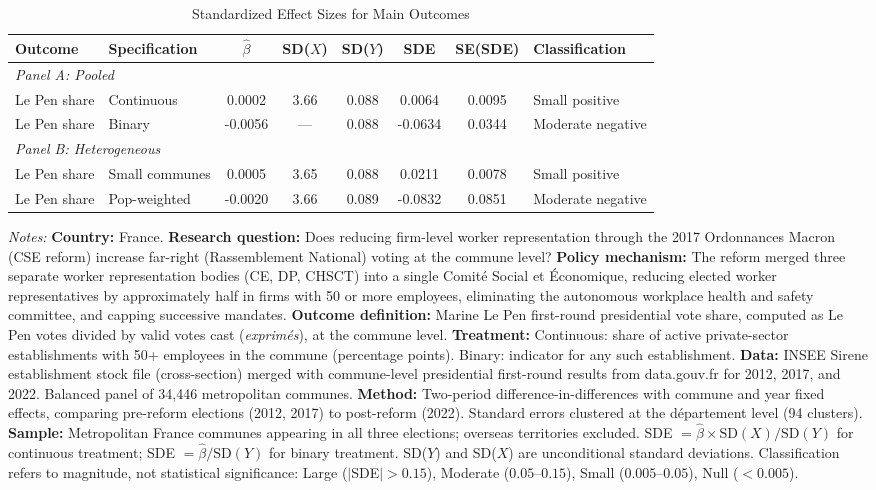 \begin{table}[H]
\centering
\caption{Standardized Effect Sizes for Main Outcomes}
\label{tab:sde}
\begin{adjustbox}{max width=\textwidth}
\begin{threeparttable}
\begin{tabular}{llcccccl}
\toprule
Outcome & Specification & $\hat{\beta}$ & SD($X$) & SD($Y$) & SDE & SE(SDE) & Classification \\
\midrule
\multicolumn{8}{l}{\textit{Panel A: Pooled}} \\
Le Pen share & Continuous & 0.0002 & 3.66 & 0.088 & 0.0064 & 0.0095 & Small positive \\
Le Pen share & Binary & -0.0056 & --- & 0.088 & -0.0634 & 0.0344 & Moderate negative \\
\midrule
\multicolumn{8}{l}{\textit{Panel B: Heterogeneous}} \\
Le Pen share & Small communes & 0.0005 & 3.65 & 0.088 & 0.0211 & 0.0078 & Small positive \\
Le Pen share & Pop-weighted & -0.0020 & 3.66 & 0.089 & -0.0832 & 0.0851 & Moderate negative \\
\bottomrule
\end{tabular}
\begin{tablenotes}
\scriptsize
\item \textit{Notes:} \textbf{Country:} France. \textbf{Research question:} Does reducing firm-level worker representation through the 2017 Ordonnances Macron (CSE reform) increase far-right (Rassemblement National) voting at the commune level? \textbf{Policy mechanism:} The reform merged three separate worker representation bodies (CE, DP, CHSCT) into a single Comit\'e Social et \'Economique, reducing elected worker representatives by approximately half in firms with 50 or more employees, eliminating the autonomous workplace health and safety committee, and capping successive mandates. \textbf{Outcome definition:} Marine Le Pen first-round presidential vote share, computed as Le Pen votes divided by valid votes cast (\textit{exprim\'es}), at the commune level. \textbf{Treatment:} Continuous: share of active private-sector establishments with 50+ employees in the commune (percentage points). Binary: indicator for any such establishment. \textbf{Data:} INSEE Sirene establishment stock file (cross-section) merged with commune-level presidential first-round results from data.gouv.fr for 2012, 2017, and 2022. Balanced panel of 34,446 metropolitan communes. \textbf{Method:} Two-period difference-in-differences with commune and year fixed effects, comparing pre-reform elections (2012, 2017) to post-reform (2022). Standard errors clustered at the d\'epartement level (94 clusters). \textbf{Sample:} Metropolitan France communes appearing in all three elections; overseas territories excluded. SDE $= \hat{\beta} \times \text{SD}(X) / \text{SD}(Y)$ for continuous treatment; SDE $= \hat{\beta} / \text{SD}(Y)$ for binary treatment. SD($Y$) and SD($X$) are unconditional standard deviations. Classification refers to magnitude, not statistical significance: Large ($|$SDE$| > 0.15$), Moderate ($0.05$--$0.15$), Small ($0.005$--$0.05$), Null ($< 0.005$).

\end{tablenotes}
\end{threeparttable}
\end{adjustbox}
\end{table}

